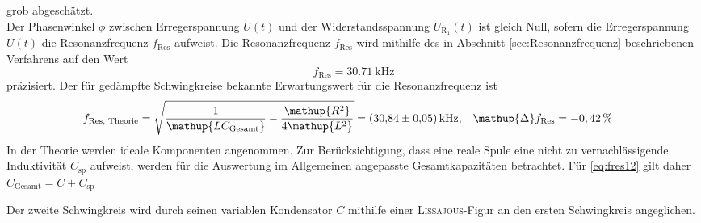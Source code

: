 grob abgeschätzt.\\
Der Phasenwinkel $\phi$ zwischen Erregerspannung $U(t)$ und der Widerstandsspannung $U_\mathup{R_1}(t)$ ist gleich Null, sofern die Erregerspannung $U(t)$ die Resonanzfrequenz $f_\text{Res}$ aufweist.
Die Resonanzfrequenz $f_\text{Res}$ wird mithilfe des in Abschnitt \ref{sec:Resonanzfrequenz} beschriebenen Verfahrens auf den Wert
\begin{equation}
	f_\text{Res} = \SI{30.71}{\kilo\hertz}
\end{equation} präzisiert.
Der %
für gedämpfte Schwingkreise bekannte Erwartungswert \cite{v354} für die Resonanzfrequenz ist
\begin{alignat}{2}
	f_\text{Res, Theorie} = \sqrt{\frac{1}{\mathup{LC_\text{Gesamt}}}-\frac{\mathup{R^2}}{4\mathup{L^2}}} = \SI{30.84\pm0.05}{\kilo\hertz}, &\quad\mathup{\Delta}f_\text{Res}=-0,42\,\%
	\label{eq:fres12}
\end{alignat}
In der Theorie werden ideale Komponenten angenommen.
Zur Berücksichtigung, dass eine reale Spule eine nicht zu vernachlässigende Induktivität $C_\text{sp}$ aufweist, werden für die Auswertung im Allgemeinen angepasste Gesamtkapazitäten betrachtet. Für \eqref{eq:fres12} gilt daher $C_\text{Gesamt}= C+C_\text{sp}$

Der zweite Schwingkreis wird durch seinen variablen Kondensator $C$ mithilfe einer \textsc{Lissajous}-Figur an den ersten Schwingkreis angeglichen.
